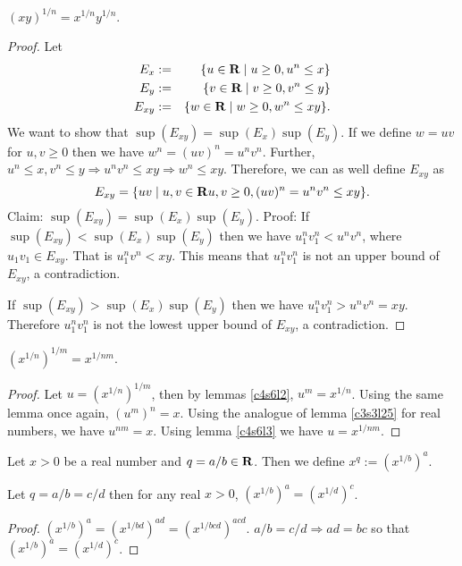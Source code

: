 \begin{lem}\label{c4s6l9}
$(xy)^{1/n} = x^{1/n}y^{1/n}$.
\end{lem}
\begin{proof}
Let
\begin{eqnarray}
E_x &:=& \{u \in \mathbf{R} \;|\; u \ge 0, u^n \le x\} \\
E_y &:=& \{v \in \mathbf{R} \;|\; v \ge 0, v^n \le y\} \\
E_{xy} &:=& \{w \in \mathbf{R} \;|\; w \ge 0, w^n \le xy\}.
\end{eqnarray}
We want to show that $\sup(E_{xy}) = \sup(E_x)\sup(E_y)$. If we define
$w = uv$ for $u, v \ge 0$ then we have $w^n = (uv)^n = u^nv^n$. Further,
$u^n \le x, v^n \le y \Rightarrow u^nv^n \le xy \Rightarrow w^n \le xy$.
Therefore, we can as well define $E_{xy}$ as
\[
E_{xy} = \{uv \;|\; u, v \in \mathbf{R} u, v \ge 0, (uv)^n = u^nv^n\le xy\}.
\]
Claim: $\sup(E_{xy}) = \sup(E_x)\sup(E_y)$.
Proof: If $\sup(E_{xy}) < \sup(E_x)\sup(E_y)$ then we have $u_1^nv_1^n <
u^nv^n$, where $u_1v_1 \in E_{xy}$. That is $u_1^nv^n < xy$. This means 
that $u_1^nv_1^n$ is not an upper bound of $E_{xy}$, a contradiction.

If $\sup(E_{xy}) > \sup(E_x)\sup(E_y)$ then we have $u_1^nv_1^n > u^nv^n
= xy$. Therefore $u_1^nv_1^n$ is not the lowest upper bound of $E_{xy}$,
a contradiction.
\end{proof}

\begin{lem}\label{c4s6l10}
$(x^{1/n})^{1/m} = x^{1/nm}$.
\end{lem}
\begin{proof}
Let $u = (x^{1/n})^{1/m}$, then by lemmas \ref{c4s6l2}, $u^m = x^{1/n}$. 
Using the same lemma once again, $(u^m)^n = x$. Using the analogue of 
lemma \ref{c3s3l25} for real numbers, we have $u^{nm} = x$. Using lemma
\ref{c4s6l3} we have $u = x^{1/nm}$.
\end{proof}

\begin{defn}\label{c4s6d4}
Let $x > 0$ be a real number and $q = a/b \in \mathbf{R}$. Then we define $x^q
:= (x^{1/b})^a$.
\end{defn}

\begin{lem}\label{c4s6l11}
Let $q = a/b = c/d$ then for any real $x > 0$, $(x^{1/b})^a = (x^{1/d})^c$.
\end{lem}
\begin{proof}
$(x^{1/b})^a = (x^{1/bd})^{ad} = (x^{1/bcd})^{acd}$. $a/b = c/d \Rightarrow
ad = bc$ so that $(x^{1/b})^a = (x^{1/d})^c$.
\end{proof}

